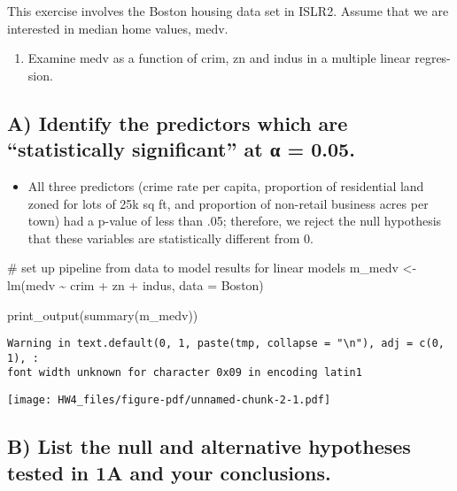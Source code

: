 \documentclass[
  letterpaper,
  DIV=11,
  numbers=noendperiod]{scrartcl}
\newenvironment{Shaded}{\begin{snugshade}}{\end{snugshade}}
\newcommand{\AttributeTok}[1]{\textcolor[rgb]{0.40,0.45,0.13}{#1}}
\newcommand{\CommentTok}[1]{\textcolor[rgb]{0.37,0.37,0.37}{#1}}
\newcommand{\FunctionTok}[1]{\textcolor[rgb]{0.28,0.35,0.67}{#1}}
\newcommand{\NormalTok}[1]{\textcolor[rgb]{0.00,0.23,0.31}{#1}}
\newcommand{\OtherTok}[1]{\textcolor[rgb]{0.00,0.23,0.31}{#1}}
\newcommand{\SpecialCharTok}[1]{\textcolor[rgb]{0.37,0.37,0.37}{#1}}
\providecommand{\tightlist}{%
  \setlength{\itemsep}{0pt}\setlength{\parskip}{0pt}}\usepackage{longtable,booktabs,array}
\begin{document}
This exercise involves the Boston housing data set in ISLR2. Assume that
we are interested in median home values, medv.

\begin{enumerate}
\def\labelenumi{\arabic{enumi}.}
\tightlist
\item
  Examine medv as a function of crim, zn and indus in a multiple linear
  regres- sion.
\end{enumerate}

\subsection{A) Identify the predictors which are ``statistically
significant'' at α =
0.05.}\label{a-identify-the-predictors-which-are-statistically-significant-at-ux3b1-0.05.}

\begin{itemize}
\tightlist
\item
  All three predictors (crime rate per capita, proportion of residential
  land zoned for lots of 25k sq ft, and proportion of non-retail
  business acres per town) had a p-value of less than .05; therefore, we
  reject the null hypothesis that these variables are statistically
  different from 0.
\end{itemize}

\begin{Shaded}
\begin{Highlighting}[]
\CommentTok{\# set up pipeline from data to model results for linear models}
\NormalTok{m\_medv }\OtherTok{\textless{}{-}} \FunctionTok{lm}\NormalTok{(medv }\SpecialCharTok{\textasciitilde{}}\NormalTok{ crim }\SpecialCharTok{+}\NormalTok{ zn }\SpecialCharTok{+}\NormalTok{ indus, }\AttributeTok{data =}\NormalTok{ Boston)}

\FunctionTok{print\_output}\NormalTok{(}\FunctionTok{summary}\NormalTok{(m\_medv))}
\end{Highlighting}
\end{Shaded}

\begin{verbatim}
Warning in text.default(0, 1, paste(tmp, collapse = "\n"), adj = c(0, 1), :
font width unknown for character 0x09 in encoding latin1
\end{verbatim}

\texttt{[image: HW4\_files/figure-pdf/unnamed-chunk-2-1.pdf]}

\subsection{B) List the null and alternative hypotheses tested in 1A and
your
conclusions.}\label{b-list-the-null-and-alternative-hypotheses-tested-in-1a-and-your-conclusions.}
\end{document}
